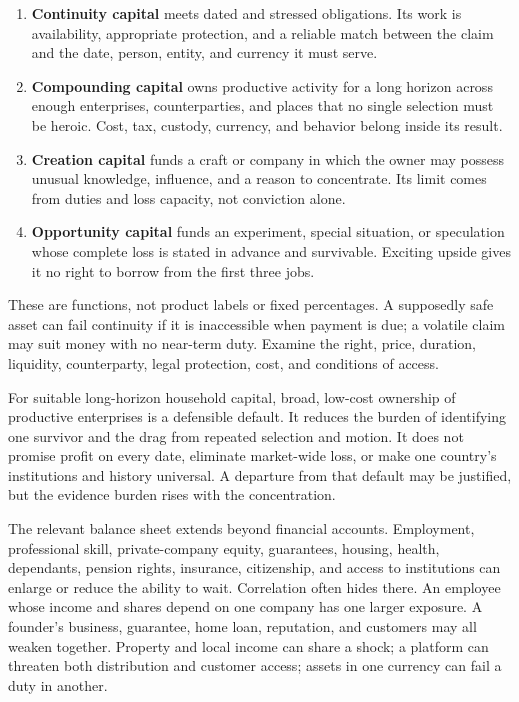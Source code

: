 \begin{enumerate}[itemsep=0.14em]
\item \textbf{Continuity capital} meets dated and stressed obligations. Its
  work is availability, appropriate protection, and a reliable match between
  the claim and the date, person, entity, and currency it must serve.
\item \textbf{Compounding capital} owns productive activity for a long horizon
  across enough enterprises, counterparties, and places that no single
  selection must be heroic. Cost, tax, custody, currency, and behavior belong
  inside its result.
\item \textbf{Creation capital} funds a craft or company in which the owner may
  possess unusual knowledge, influence, and a reason to concentrate. Its limit
  comes from duties and loss capacity, not conviction alone.
\item \textbf{Opportunity capital} funds an experiment, special situation, or
  speculation whose complete loss is stated in advance and survivable. Exciting
  upside gives it no right to borrow from the first three jobs.
\end{enumerate}

These are functions, not product labels or fixed percentages. A supposedly safe
asset can fail continuity if it is inaccessible when payment is due; a volatile
claim may suit money with no near-term duty. Examine the right, price, duration,
liquidity, counterparty, legal protection, cost, and conditions of access.

For suitable long-horizon household capital, broad, low-cost ownership of
productive enterprises is a defensible default. It reduces the burden of
identifying one survivor and the drag from repeated selection and motion. It
does not promise profit on every date, eliminate market-wide loss, or make one
country's institutions and history universal. A departure from that default
may be justified, but the evidence burden rises with the concentration.

The relevant balance sheet extends beyond financial accounts. Employment,
professional skill, private-company equity, guarantees, housing, health,
dependants, pension rights, insurance, citizenship, and access to institutions
can enlarge or reduce the ability to wait. Correlation often hides there. An
employee whose income and shares depend on one company has one larger exposure.
A founder's business, guarantee, home loan, reputation, and customers may all
weaken together. Property and local income can share a shock; a platform can
threaten both distribution and customer access; assets in one currency can
fail a duty in another.

